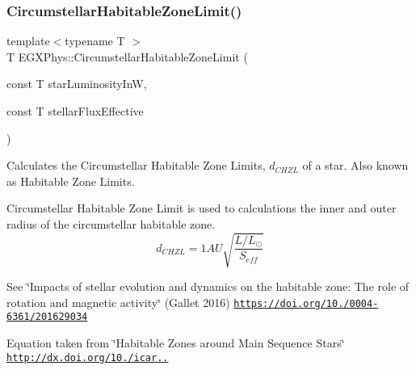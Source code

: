 \subsubsection{\texorpdfstring{Circumstellar\+Habitable\+Zone\+Limit()}{CircumstellarHabitableZoneLimit()}}
{\footnotesize\ttfamily template$<$typename T $>$ \\
T E\+G\+X\+Phys\+::\+Circumstellar\+Habitable\+Zone\+Limit (\begin{DoxyParamCaption}\item[{const T}]{star\+Luminosity\+InW,  }\item[{const T}]{stellar\+Flux\+Effective }\end{DoxyParamCaption})}



Calculates the Circumstellar Habitable Zone Limits, $d_{CHZL}$ of a star. Also known as Habitable Zone Limits. 

Circumstellar Habitable Zone Limit is used to calculations the inner and outer radius of the circumstellar habitable zone. \[d_{CHZL}=1AU \sqrt{ \frac{L/L_\odot}{S_{eff}} }\]

See \char`\"{}\+Impacts of stellar evolution and dynamics on the habitable zone\+: The role of rotation and magnetic activity\char`\"{} (Gallet 2016) \href{https://doi.org/10.1051/0004-6361/201629034}{\tt https\+://doi.\+org/10./0004-\/6361/201629034}

Equation taken from \char`\"{}\+Habitable Zones around Main Sequence Stars\char`\"{} \href{http://dx.doi.org/10.1006/icar.1993.1010}{\tt http\+://dx.\+doi.\+org/10./icar..}



